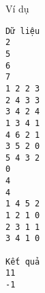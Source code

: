 Ví dụ
\begin{verbatim}
Dữ liệu
2
5
6
7
1 2 2 3
2 4 3 3
3 4 2 4
1 3 4 1
4 6 2 1
3 5 2 0
5 4 3 2
0
4
4
1 4 5 2
1 2 1 0
2 3 1 1
3 4 1 0

Kết quả
11
-1
\end{verbatim}